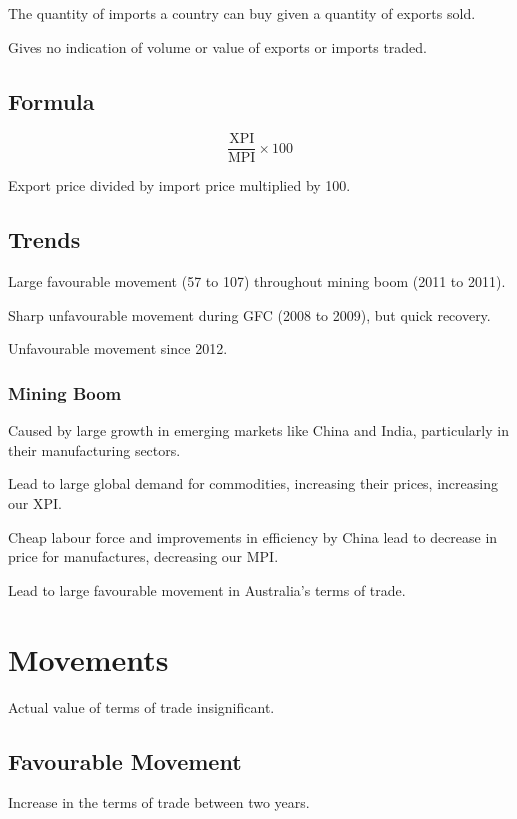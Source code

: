 \documentclass[a4paper,11pt]{article}
\begin{document}
The quantity of imports a country can buy given a quantity of exports sold.

Gives no indication of volume or value of exports or imports traded.


\subsection{Formula}

$$
\frac{\text{XPI}}{\text{MPI}} \times 100
$$

Export price divided by import price multiplied by 100.


\subsection{Trends}

Large favourable movement (57 to 107) throughout mining boom (2011 to 2011).

Sharp unfavourable movement during GFC (2008 to 2009), but quick recovery.

Unfavourable movement since 2012.


\subsubsection{Mining Boom}

Caused by large growth in emerging markets like China and India, particularly
in their manufacturing sectors.

Lead to large global demand for commodities, increasing their prices,
increasing our XPI.

Cheap labour force and improvements in efficiency by China lead to decrease in
price for manufactures, decreasing our MPI.

Lead to large favourable movement in Australia's terms of trade.




\section{Movements}

Actual value of terms of trade insignificant.


\subsection{Favourable Movement}

Increase in the terms of trade between two years.
\end{document}
